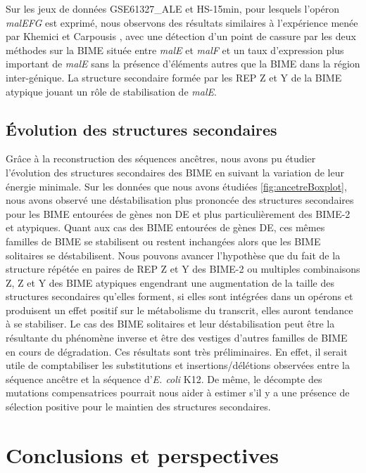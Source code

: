 \documentclass[12pt,a4paper]{report}
\begin{document}
\begin{onehalfspace}
Sur les jeux de données GSE61327\_ALE et HS-15min, pour lesquels l'opéron \textit{malEFG} est exprimé, nous observons des résultats similaires à l'expérience menée par Khemici et Carpousis \citep{Khemici2004}, avec une détection d'un point de cassure par les deux méthodes sur la BIME située entre \textit{malE} et \textit{malF} et un taux d'expression plus important de \textit{malE} sans la présence d'éléments autres que la BIME dans la région inter-génique. La structure secondaire formée par les REP Z et Y de la BIME atypique jouant un rôle de stabilisation de \textit{malE}.


\section*{Évolution des structures secondaires}

Grâce à la reconstruction des séquences ancêtres, nous avons pu étudier l'évolution des structures secondaires des BIME en suivant la variation de leur énergie minimale. Sur les données que nous avons étudiées \autoref{fig:ancetreBoxplot}, nous avons observé une déstabilisation plus prononcée des structures secondaires pour les BIME entourées de gènes non DE et plus particulièrement des BIME-2 et atypiques. Quant aux cas des BIME entourées de gènes DE, ces mêmes familles de BIME se stabilisent ou restent inchangées alors que les BIME solitaires se déstabilisent. Nous pouvons avancer l'hypothèse que du fait de la structure répétée en paires de REP Z et Y des BIME-2 ou multiples combinaisons Z, Z et Y des BIME atypiques engendrant une augmentation de la taille des structures secondaires qu'elles forment, si elles sont intégrées dans un opérons et produisent un effet positif sur le métabolisme du transcrit, elles auront tendance à se stabiliser. Le cas des BIME solitaires et leur déstabilisation peut être la résultante du phénomène inverse et être des vestiges d'autres familles de BIME en cours de dégradation. Ces résultats sont très préliminaires. En effet, il serait utile de comptabiliser les substitutions et insertions/délétions observées entre la séquence ancêtre et la séquence d'\textit{E. coli} K12. De même, le décompte des mutations compensatrices pourrait nous aider à estimer s'il y a une présence de sélection positive pour le maintien des structures secondaires.

\chapter*{Conclusions et perspectives}


\end{onehalfspace}
\end{document}
